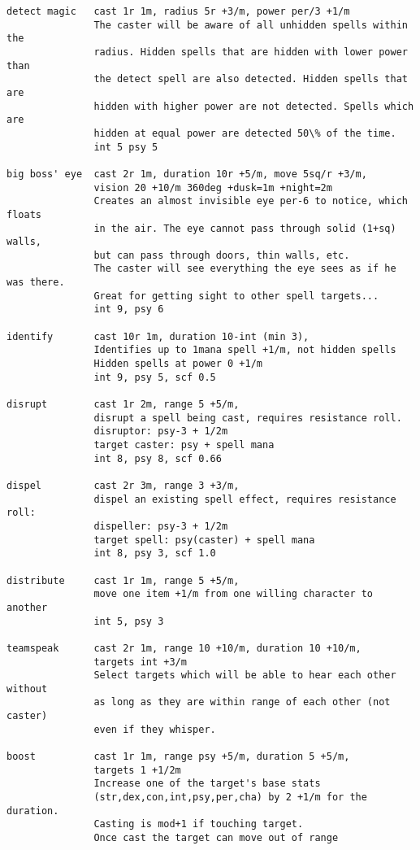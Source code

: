 \begin{verbatim}
detect magic   cast 1r 1m, radius 5r +3/m, power per/3 +1/m
               The caster will be aware of all unhidden spells within the
               radius. Hidden spells that are hidden with lower power than
               the detect spell are also detected. Hidden spells that are
               hidden with higher power are not detected. Spells which are
               hidden at equal power are detected 50\% of the time.
               int 5 psy 5

big boss' eye  cast 2r 1m, duration 10r +5/m, move 5sq/r +3/m,
               vision 20 +10/m 360deg +dusk=1m +night=2m
               Creates an almost invisible eye per-6 to notice, which floats
               in the air. The eye cannot pass through solid (1+sq) walls,
               but can pass through doors, thin walls, etc.
               The caster will see everything the eye sees as if he was there.
               Great for getting sight to other spell targets...
               int 9, psy 6

identify       cast 10r 1m, duration 10-int (min 3),
               Identifies up to 1mana spell +1/m, not hidden spells
               Hidden spells at power 0 +1/m
               int 9, psy 5, scf 0.5

disrupt        cast 1r 2m, range 5 +5/m,
               disrupt a spell being cast, requires resistance roll.
               disruptor: psy-3 + 1/2m
               target caster: psy + spell mana
               int 8, psy 8, scf 0.66

dispel         cast 2r 3m, range 3 +3/m,
               dispel an existing spell effect, requires resistance roll:
               dispeller: psy-3 + 1/2m
               target spell: psy(caster) + spell mana
               int 8, psy 3, scf 1.0

distribute     cast 1r 1m, range 5 +5/m,
               move one item +1/m from one willing character to another
               int 5, psy 3

teamspeak      cast 2r 1m, range 10 +10/m, duration 10 +10/m,
               targets int +3/m
               Select targets which will be able to hear each other without
               as long as they are within range of each other (not caster)
               even if they whisper.

boost          cast 1r 1m, range psy +5/m, duration 5 +5/m,
               targets 1 +1/2m
               Increase one of the target's base stats
               (str,dex,con,int,psy,per,cha) by 2 +1/m for the duration.
               Casting is mod+1 if touching target.
               Once cast the target can move out of range




\end{verbatim}
